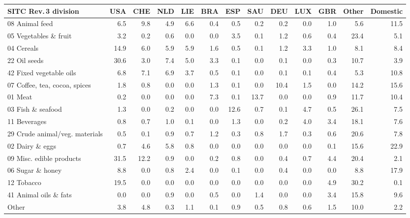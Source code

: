 \begin{tabular}{lrrrrrrrrrrrr}
\toprule
SITC Rev.\,3 division & USA & CHE & NLD & LIE & BRA & ESP & SAU & DEU & LUX & GBR & Other & Domestic \\
\midrule
08 Animal feed & 6.5 & 9.8 & 4.9 & 6.6 & 0.4 & 0.5 & 0.2 & 0.2 & 0.0 & 1.0 & 5.6 & 11.5 \\
05 Vegetables \& fruit & 3.2 & 0.2 & 0.6 & 0.0 & 0.0 & 3.5 & 0.1 & 1.2 & 0.6 & 0.4 & 23.4 & 5.1 \\
04 Cereals & 14.9 & 6.0 & 5.9 & 5.9 & 1.6 & 0.5 & 0.1 & 1.2 & 3.3 & 1.0 & 8.1 & 8.4 \\
22 Oil seeds & 30.6 & 3.0 & 7.4 & 5.0 & 3.3 & 0.1 & 0.0 & 0.1 & 0.0 & 0.3 & 10.7 & 3.9 \\
42 Fixed vegetable oils & 6.8 & 7.1 & 6.9 & 3.7 & 0.5 & 0.1 & 0.0 & 0.1 & 0.1 & 0.4 & 5.3 & 10.8 \\
07 Coffee, tea, cocoa, spices & 1.8 & 0.8 & 0.0 & 0.0 & 1.3 & 0.1 & 0.0 & 10.4 & 1.5 & 0.0 & 14.2 & 15.6 \\
01 Meat & 0.2 & 0.0 & 0.0 & 0.0 & 7.3 & 0.1 & 13.7 & 0.0 & 0.0 & 0.9 & 11.7 & 10.4 \\
03 Fish \& seafood & 1.3 & 0.0 & 0.2 & 0.0 & 0.0 & 12.6 & 0.7 & 0.1 & 4.7 & 0.5 & 26.1 & 7.5 \\
11 Beverages & 0.8 & 0.7 & 1.0 & 0.1 & 0.0 & 1.3 & 0.0 & 0.2 & 4.0 & 3.4 & 18.1 & 7.6 \\
29 Crude animal/veg. materials & 0.5 & 0.1 & 0.9 & 0.7 & 1.2 & 0.3 & 0.8 & 1.7 & 0.3 & 0.6 & 20.6 & 7.8 \\
02 Dairy \& eggs & 0.7 & 4.6 & 5.8 & 0.8 & 0.0 & 0.0 & 0.0 & 0.0 & 0.0 & 0.1 & 15.6 & 22.9 \\
09 Misc. edible products & 31.5 & 12.2 & 0.9 & 0.0 & 0.2 & 0.8 & 0.0 & 0.4 & 0.7 & 4.4 & 20.4 & 2.1 \\
06 Sugar \& honey & 8.8 & 0.0 & 0.8 & 2.4 & 0.0 & 0.1 & 0.0 & 0.4 & 0.0 & 0.0 & 8.8 & 17.9 \\
12 Tobacco & 19.5 & 0.0 & 0.0 & 0.0 & 0.0 & 0.0 & 0.0 & 0.0 & 0.0 & 4.9 & 30.2 & 0.1 \\
41 Animal oils \& fats & 0.0 & 0.0 & 0.9 & 0.0 & 0.5 & 0.0 & 1.4 & 0.0 & 0.0 & 3.4 & 15.8 & 9.6 \\
Other & 3.8 & 4.8 & 0.3 & 1.1 & 0.1 & 0.9 & 0.5 & 0.8 & 0.6 & 1.5 & 10.0 & 2.2 \\
\bottomrule
\end{tabular}
